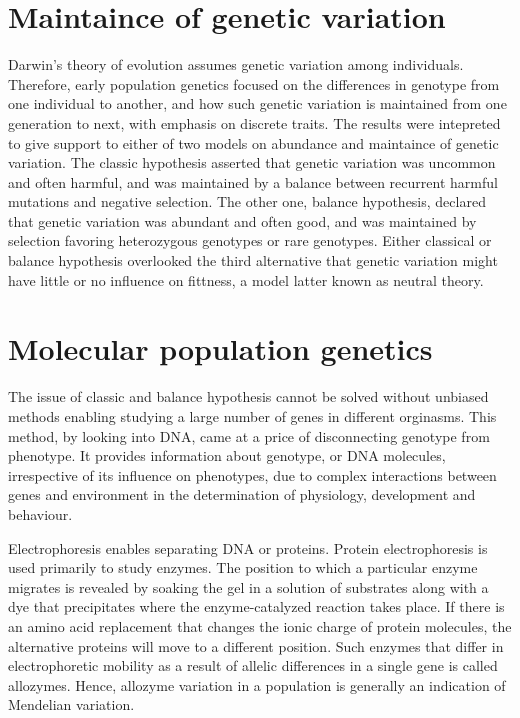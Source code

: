 \documentclass[11pt]{article}
\begin{document}
\begin{sloppypar}
\section{Maintaince of genetic variation}
Darwin's theory of evolution assumes genetic variation among individuals. 
Therefore, early population genetics focused on the differences in genotype from one individual to another, and how such genetic variation is maintained from one generation to next, with emphasis on discrete traits. 
The results were intepreted to give support to either of two models on abundance and maintaince of genetic variation. 
The classic hypothesis asserted that genetic variation was uncommon and often harmful, and was maintained by a balance between recurrent harmful mutations and negative selection. 
The other one, balance hypothesis, declared that genetic variation was abundant and often good, and was maintained by selection favoring heterozygous genotypes or rare genotypes. 
Either classical or balance hypothesis overlooked the third alternative that genetic variation might have little or no influence on fittness, a model latter known as neutral theory. 

\section{Molecular population genetics}
The issue of classic and balance hypothesis cannot be solved without unbiased methods enabling studying a large number of genes in different orginasms. 
This method, by looking into DNA, came at a price of disconnecting genotype from phenotype. 
It provides information about genotype, or DNA molecules, irrespective of its influence on phenotypes, due to complex interactions between genes and environment in the determination of physiology, development and behaviour. 

\par

Electrophoresis enables separating DNA or proteins. 
Protein electrophoresis is used primarily to study enzymes. 
The position to which a particular enzyme migrates is revealed by soaking the gel in a solution of substrates along with a dye that precipitates where the enzyme-catalyzed reaction takes place. 
If there is an amino acid replacement that changes the ionic charge of protein molecules, the alternative proteins will move to a different position. 
Such enzymes that differ in electrophoretic mobility as a result of allelic differences in a single gene is called allozymes. 
Hence, allozyme variation in a population is generally an indication of Mendelian variation. 


\end{sloppypar}
\end{document}
